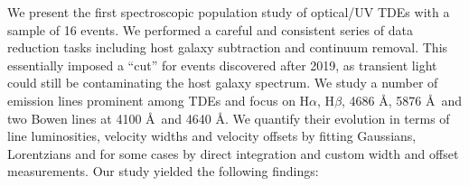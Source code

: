 \documentclass[structabstract]{aa}
\begin{document}
We present the first spectroscopic population study of optical/UV TDEs with a sample of 16 events.
We performed a careful and consistent series of data reduction tasks including host galaxy subtraction and continuum removal. This essentially imposed a ``cut'' for events discovered after 2019, as transient light could still be contaminating the host galaxy spectrum.
We study a number of emission lines prominent among TDEs and focus on H$\alpha$, H$\beta$,  4686 \AA,  5876 \AA\, and two  Bowen lines at 4100 \AA\, and 4640 \AA. We quantify their evolution in terms of line luminosities, velocity widths and velocity offsets by fitting Gaussians, Lorentzians and for some cases by direct integration and custom width and offset measurements.
Our study yielded the following findings:

\begin{enumerate}[label={\arabic*.}]


\end{enumerate}
\end{document}
